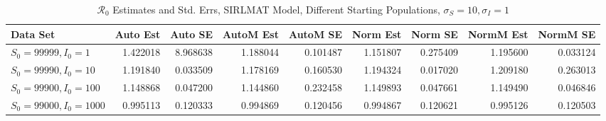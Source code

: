 \documentclass[12pt]{article}
\newcommand{\rr}{\ensuremath{\mathcal{R}_0}}
\begin{document}
\begin{table}[H]
	
	\caption{$\rr$ Estimates and Std. Errs, SIRLMAT Model,
		Different Starting Populations, 
		$\sigma_S = 10, \sigma_I = 1$}
	\begin{footnotesize}
		\hskip -1.7cm
	\begin{tabular}{l|r|r|r|r|r|r|r|r}
		\hline
		Data Set & Auto Est & Auto SE & AutoM Est & AutoM SE & Norm Est & Norm SE & NormM Est & NormM SE\\
		\hline
		$S_0 = 99999, I_0 = 1$ & 1.422018 & 8.968638 & 1.188044 & 0.101487 & 1.151807 & 0.275409 & 1.195600 & 0.033124\\
		\hline
		$S_0 = 99990, I_0 = 10$ & 1.191840 & 0.033509 & 1.178169 & 0.160530 & 1.194324 & 0.017020 & 1.209180 & 0.263013\\
		\hline
		$S_0 = 99900, I_0 = 100$ & 1.148868 & 0.047200 & 1.144860 & 0.232458 & 1.149893 & 0.047661 & 1.149490 & 0.046846\\
		\hline
		$S_0 = 99000, I_0 = 1000$ & 0.995113 & 0.120333 & 0.994869 & 0.120456 & 0.994867 & 0.120621 & 0.995126 & 0.120503\\
		\hline
	\end{tabular}
\end{footnotesize}
\end{table}
\end{document}
